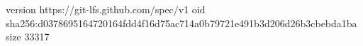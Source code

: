 version https://git-lfs.github.com/spec/v1
oid sha256:d0378695164720164fdd4f16d75ac714a0b79721e491b3d206d26b3cbebda1ba
size 33317
